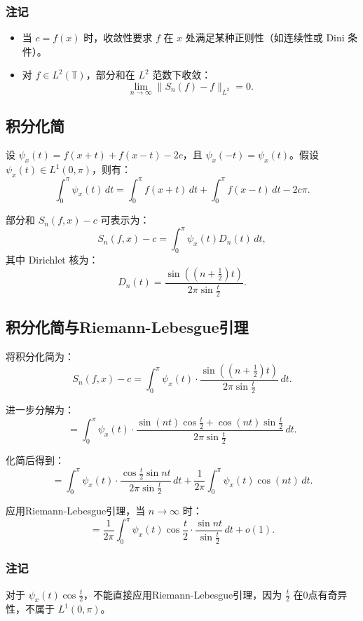 \documentclass[12pt]{article}
\begin{document}
	\subsubsection{注记}
	\begin{itemize}
		\item 当 $c = f(x)$ 时，收敛性要求 $f$ 在 $x$ 处满足某种正则性（如连续性或 Dini 条件）。
		\item 对 $f \in L^2(\mathbb{T})$，部分和在 $L^2$ 范数下收敛：
		\[
		\lim_{n \to \infty} \| S_n(f) - f \|_{L^2} = 0.
		\]
	\end{itemize}
	
	\subsection{积分化简}
	设 \(\psi_x(t) = f(x+t) + f(x-t) - 2c\)，且 \(\psi_x(-t) = \psi_x(t)\)。假设 \(\psi_x(t) \in L^1(0, \pi)\)，则有：
	\[
	\int_0^\pi \psi_x(t) \, dt = \int_0^\pi f(x+t) \, dt + \int_0^\pi f(x-t) \, dt - 2c\pi.
	\]
	
	部分和 \(S_n(f, x) - c\) 可表示为：
	\[
	S_n(f, x) - c = \int_0^\pi \psi_x(t) D_n(t) \, dt,
	\]
	其中 Dirichlet 核为：
	\[
	D_n(t) = \frac{\sin\left( (n+\frac{1}{2})t \right)}{2\pi \sin \frac{t}{2}}.
	\]
	
	\subsection{积分化简与Riemann-Lebesgue引理}
	
	将积分化简为：
	\[
	S_n(f, x) - c = \int_0^\pi \psi_x(t) \cdot \frac{\sin\left( (n+\frac{1}{2})t \right)}{2\pi \sin \frac{t}{2}} \, dt.
	\]
	
	进一步分解为：
	\[
	= \int_0^\pi \psi_x(t) \cdot \frac{\sin(nt) \cos \frac{t}{2} + \cos(nt) \sin \frac{t}{2}}{2\pi \sin \frac{t}{2}} \, dt.
	\]
	
	化简后得到：
	\[
	= \int_0^\pi \psi_x(t) \cdot \frac{\cos \frac{t}{2} \sin nt}{2\pi \sin \frac{t}{2}} \, dt + \frac{1}{2\pi} \int_0^\pi \psi_x(t) \cos(nt) \, dt.
	\]
	
	应用Riemann-Lebesgue引理，当 \(n \to \infty\) 时：
	\[
	= \frac{1}{2\pi} \int_0^\pi \psi_x(t) \cos \frac{t}{2} \cdot \frac{\sin nt}{\sin \frac{t}{2}} \, dt + o(1).
	\]
	
	\subsubsection{注记}
	
	对于 \(\psi_x(t) \cos \frac{t}{2}\)，不能直接应用Riemann-Lebesgue引理，因为 \(\frac{t}{2}\) 在0点有奇异性，不属于 \(L^1(0, \pi)\)。
	
\end{document}
